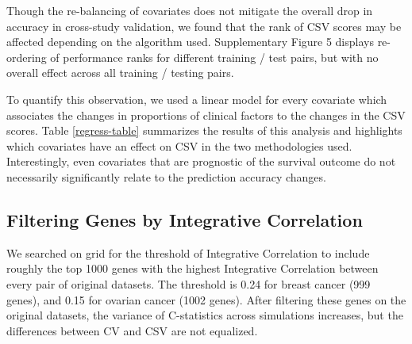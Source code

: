 \documentclass{bioinfo}
\begin{document}
  Though the re-balancing of covariates does not mitigate the overall drop in accuracy in cross-study
  validation, we found that the rank of CSV scores may be affected
  depending on the algorithm used. Supplementary Figure 5 displays 
  re-ordering of performance ranks for different training / test pairs,
  but with no overall effect across all training / testing pairs. 


To quantify this observation,
  we used a linear model for every covariate which associates the changes in proportions of 
  clinical factors to the changes in the CSV scores. Table
  \ref{regress-table} summarizes the results of this analysis and highlights which covariates have an effect
on CSV in the two methodologies used. 
Interestingly, even covariates that are prognostic of the survival
outcome do not necessarily significantly relate
  to the prediction accuracy changes.
  	

 
  \subsection{Filtering Genes by Integrative Correlation}
  We searched on grid for the threshold of Integrative Correlation \citep{Parmigiani2004, Garrett-Mayer2008} to include roughly the top 1000 genes with the highest Integrative Correlation between every pair of original datasets. The threshold is 0.24 for breast cancer (999 genes), and 0.15 for ovarian cancer (1002 genes). After filtering these genes on the original datasets, the variance of C-statistics across simulations increases, but the differences between CV and CSV are not equalized. 
  
\end{document}
